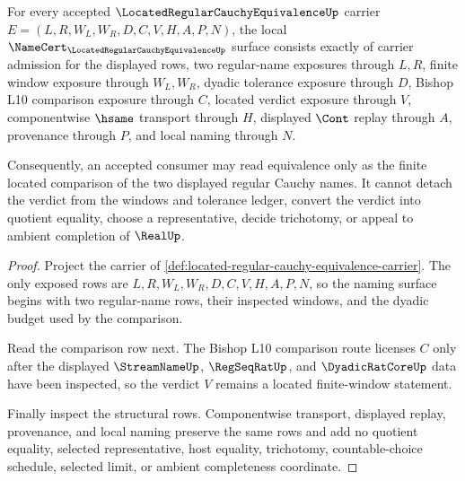 \begin{theorem}
\label{thm:located-regular-cauchy-equivalence-namecert-obligations}
For every accepted $\LocatedRegularCauchyEquivalenceUp$ carrier $E=(L,R,W_L,W_R,D,C,V,H,A,P,N)$, the local $\NameCert_{\LocatedRegularCauchyEquivalenceUp}$ surface consists exactly of carrier admission for the displayed rows, two regular-name exposures through $L,R$, finite window exposure through $W_L,W_R$, dyadic tolerance exposure through $D$, Bishop L10 comparison exposure through $C$, located verdict exposure through $V$, componentwise $\hsame$ transport through $H$, displayed $\Cont$ replay through $A$, provenance through $P$, and local naming through $N$.

Consequently, an accepted consumer may read equivalence only as the finite located comparison of the two displayed regular Cauchy names. It cannot detach the verdict from the windows and tolerance ledger, convert the verdict into quotient equality, choose a representative, decide trichotomy, or appeal to ambient completion of $\RealUp$.
\end{theorem}
\begin{proof}
Project the carrier of \autoref{def:located-regular-cauchy-equivalence-carrier}. The only exposed rows are $L,R,W_L,W_R,D,C,V,H,A,P,N$, so the naming surface begins with two regular-name rows, their inspected windows, and the dyadic budget used by the comparison.

Read the comparison row next. The Bishop L10 comparison route licenses $C$ only after the displayed $\StreamNameUp$, $\RegSeqRatUp$, and $\DyadicRatCoreUp$ data have been inspected, so the verdict $V$ remains a located finite-window statement.

Finally inspect the structural rows. Componentwise transport, displayed replay, provenance, and local naming preserve the same rows and add no quotient equality, selected representative, host equality, trichotomy, countable-choice schedule, selected limit, or ambient completeness coordinate.
\end{proof}

